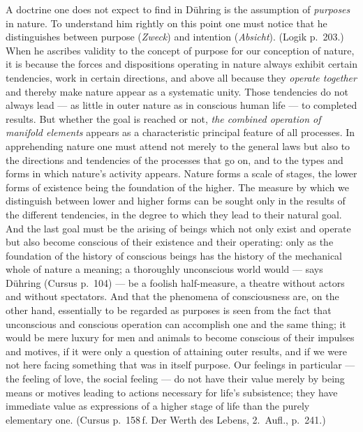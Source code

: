 \documentclass[12pt,a4paper]{book}
\newcommand{\opage}[1]{\marginnote{\footnotesize\textit{[#1]}}}
\begin{document}
\opage{562}A doctrine one does not expect to find in Dühring is the assumption of
\emph{purposes} in nature. To understand him rightly on this point one must
notice that he distinguishes between purpose (\textit{Zweck}) and intention
(\textit{Absicht}). (Logik p.~203.) When he ascribes validity to the concept of
purpose for our conception of nature, it is because the forces and dispositions
operating in nature always exhibit certain tendencies, work in certain
directions, and above all because they \emph{operate together} and thereby make
nature appear as a systematic unity. Those tendencies do not always lead --- as
little in outer nature as in conscious human life --- to completed results. But
whether the goal is reached or not, \emph{the combined operation of manifold
elements} appears as a characteristic principal feature of all processes. In
apprehending nature one must attend not merely to the general laws but also to
the directions and tendencies of the processes that go on, and to the types and
forms in which nature's activity appears. Nature forms a scale of stages, the
lower forms of existence being the foundation of the higher. The measure by which
we distinguish between lower and higher forms can be sought only in the results
of the different tendencies, in the degree to which they lead to their natural
goal. And the last goal must be the arising of beings which not only exist and
operate but also become conscious of their existence and their operating: only as
the foundation of the history of conscious beings has the history of the
mechanical whole of nature a meaning; a thoroughly unconscious world would ---
says Dühring (Cursus p.~104) --- be a foolish half-measure, a theatre without
actors and without spectators. And that the phenomena of consciousness are, on
the other hand, essentially to be regarded as purposes is seen from the fact that
unconscious and conscious operation can accomplish one and the same thing; it
would be mere luxury for men and animals to become conscious of their impulses
and motives, if it were only a question of attaining outer results, and if we
were not here facing something that was in itself purpose. Our feelings in
particular --- the feeling of love, the social feeling --- do not have their
value merely by being means or motives leading to actions necessary for life's
\opage{563}subsistence; they have immediate value as expressions of a higher stage of life
than the purely elementary one. (Cursus p.~158\,f. Der Werth des Lebens,
2.~Aufl., p.~241.)
\end{document}
